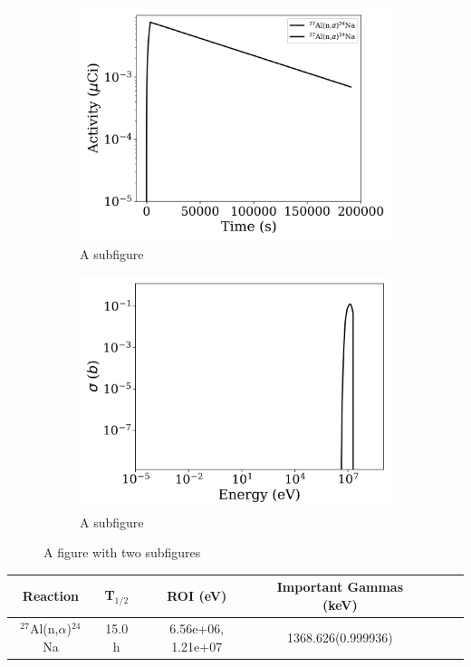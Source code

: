\begin{figure}[h]
\centering
\begin{subfigure}{.5\textwidth}
  \centering
     \includegraphics[width=.8\textwidth]{plot/Al-27(n,alpha)Na-24_library1} 

  \caption{A subfigure}
  \label{fig:sub1}
\end{subfigure}%
\begin{subfigure}{.5\textwidth}
  \centering
     \includegraphics[width=.8\textwidth]{plot/Al-27(n,alpha)Na-24} 

  \caption{A subfigure}
  \label{fig:sub2}
\end{subfigure}
\caption{A figure with two subfigures}
\label{fig:test}
\end{figure}

\begin{table}[h]
\centering
\begin{tabular}{ |c|c|c|c|c|c|c| }
 \hline
 Reaction & T$_{1/2}$ & ROI (eV) & Important Gammas (keV) \\
 \hline 
 $^{27}$Al(n,$\alpha$)$^{24}$Na & 15.0 h & 6.56e+06, 1.21e+07 & 1368.626(0.999936) \\ 
\hline
\end{tabular}
\end{table}
